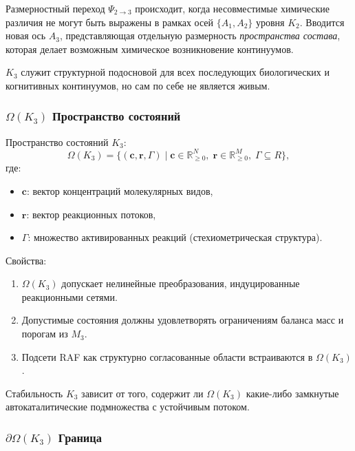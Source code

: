 Размерностный переход $\Psi_{2\to3}$ происходит, когда несовместимые
химические различия не могут быть выражены в рамках осей $\{A_1,A_2\}$
уровня $K_2$. Вводится новая ось $A_3$, представляющая отдельную
размерность
\emph{пространства состава}, которая делает возможным химическое
возникновение континуумов.

$K_3$ служит структурной подосновой для всех последующих биологических и
когнитивных континуумов, но сам по себе не является живым.

\subsubsection{\texorpdfstring{$\Omega(K_3)$}{\Omega(K_3)} Пространство состояний}

Пространство состояний $K_3$:
\[
\Omega(K_3) = \{ (\mathbf{c}, \mathbf{r}, \Gamma) \mid
\mathbf{c} \in \mathbb{R}_{\ge0}^N,\;
\mathbf{r} \in \mathbb{R}_{\ge0}^M,\;
\Gamma \subseteq R \},
\]
где:
\begin{itemize}
    \item $\mathbf{c}$: вектор концентраций молекулярных видов,
    \item $\mathbf{r}$: вектор реакционных потоков,
    \item $\Gamma$: множество активированных реакций (стехиометрическая структура).
\end{itemize}

Свойства:
\begin{enumerate}
    \item $\Omega(K_3)$ допускает нелинейные преобразования, индуцированные
          реакционными сетями.
    \item Допустимые состояния должны удовлетворять ограничениям баланса масс и
          порогам из $M_3$.
    \item Подсети RAF как структурно согласованные области встраиваются в
          $\Omega(K_3)$.
\end{enumerate}

Стабильность $K_3$ зависит от того, содержит ли $\Omega(K_3)$ какие-либо
замкнутые автокаталитические подмножества с устойчивым потоком.

\subsubsection{\texorpdfstring{$\partial\Omega(K_3)$}{\partial\Omega(K_3)} Граница}

